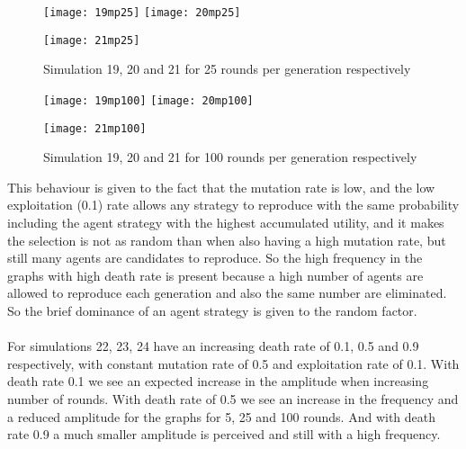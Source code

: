 \documentclass{book}
\begin{document}
\begin{figure}[H]       
    \begin{center}
    \mbox{\texttt{[image: 19mp25]}}   
    \hspace{0px}
    \mbox{\texttt{[image: 20mp25]}}
    \hspace{40px}
    \end{center}
    \begin{center}
    \mbox{\texttt{[image: 21mp25]}}
    \end{center}
    \caption{Simulation 19, 20 and 21 for 25 rounds per generation respectively}
    \label{simulation192021mp25}
\end{figure}

\begin{figure}[H]       
    \begin{center}
    \mbox{\texttt{[image: 19mp100]}}   
    \hspace{0px}
    \mbox{\texttt{[image: 20mp100]}}
    \hspace{40px}
    \end{center}
    \begin{center}
    \mbox{\texttt{[image: 21mp100]}}
    \end{center}
    \caption{Simulation 19, 20 and 21 for 100 rounds per generation respectively}
    \label{simulation192021mp100}
\end{figure}
This behaviour is given to the fact that the mutation rate is low, and the low exploitation (0.1) rate allows any  strategy to reproduce with the same probability including the agent strategy with the highest accumulated utility, and it makes the selection is not as random than when also having a high mutation rate, but still many agents are candidates to reproduce. So the high frequency in the graphs with high death rate is present because  a high number of agents are allowed to reproduce each generation and also the same number are eliminated. So the brief dominance of an agent strategy is given to the random factor. 
\\\\ For simulations 22, 23, 24 have an increasing death rate of 0.1, 0.5 and 0.9 respectively, with constant mutation rate of 0.5 and exploitation rate of 0.1. With death rate 0.1 we see an expected increase in the amplitude when increasing number of rounds. With death rate of 0.5 we see an increase in the frequency and a reduced amplitude for the graphs for 5, 25 and 100 rounds. And with death rate 0.9 a much smaller amplitude is perceived and still with a high frequency.
\end{document}
